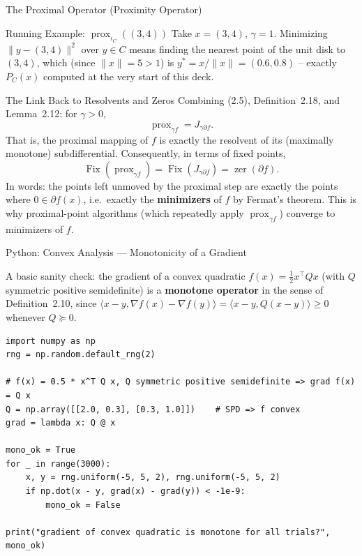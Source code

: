 \documentclass[aspectratio=169,10pt]{beamer}
\DeclareMathOperator{\Fix}{Fix}
\DeclareMathOperator{\zer}{zer}
\begin{document}
\begin{frame}[allowframebreaks]{The Proximal Operator (Proximity Operator)}
  \begin{exampleblock}{Running Example: $\operatorname{prox}_{\iota_C}((3,4))$}
    Take $x = (3,4)$, $\gamma = 1$. Minimizing $\|y-(3,4)\|^2$ over $y \in C$
    means finding the nearest point of the unit disk to $(3,4)$, which (since
    $\|x\|=5>1$) is $y^* = x/\|x\| = (0.6, 0.8)$ -- exactly $P_C(x)$ computed
    at the very start of this deck.
  \end{exampleblock}

  \framebreak

  \begin{block}{The Link Back to Resolvents and Zeros}
    Combining (2.5), Definition~2.18, and Lemma~2.12: for $\gamma > 0$,
    \[
      \operatorname{prox}_{\gamma f} = J_{\gamma \partial f}.
    \]
    That is, the proximal mapping of $f$ is exactly the resolvent of its
    (maximally monotone) subdifferential. Consequently, in terms of fixed
    points,
    \[
      \Fix(\operatorname{prox}_{\gamma f}) = \Fix(J_{\gamma \partial f}) = \zer(\partial f).
    \]
    In words: the points left unmoved by the proximal step are exactly the
    points where $0 \in \partial f(x)$, i.e.\ exactly the \textbf{minimizers}
    of $f$ by Fermat's theorem. This is why proximal-point algorithms (which
    repeatedly apply $\operatorname{prox}_{\gamma f}$) converge to
    minimizers of $f$.
  \end{block}

\end{frame}

\begin{frame}[fragile]{Python: Convex Analysis --- Monotonicity of a Gradient}

A basic sanity check: the gradient of a convex quadratic
$f(x) = \tfrac12 x^\top Q x$ (with $Q$ symmetric positive semidefinite) is a
\textbf{monotone operator} in the sense of Definition~2.10, since
$\langle x-y, \nabla f(x) - \nabla f(y)\rangle = \langle x-y, Q(x-y)\rangle
\ge 0$ whenever $Q \succeq 0$.

\begin{lstlisting}[style=pycode]
import numpy as np
rng = np.random.default_rng(2)

# f(x) = 0.5 * x^T Q x, Q symmetric positive semidefinite => grad f(x) = Q x
Q = np.array([[2.0, 0.3], [0.3, 1.0]])    # SPD => f convex
grad = lambda x: Q @ x

mono_ok = True
for _ in range(3000):
    x, y = rng.uniform(-5, 5, 2), rng.uniform(-5, 5, 2)
    if np.dot(x - y, grad(x) - grad(y)) < -1e-9:
        mono_ok = False

print("gradient of convex quadratic is monotone for all trials?", mono_ok)
\end{lstlisting}

\end{frame}
\end{document}
